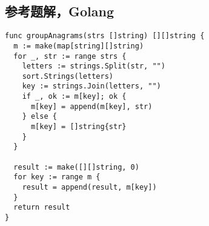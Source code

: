\subsection{参考题解，Golang}

\begin{verbatim}
func groupAnagrams(strs []string) [][]string {
  m := make(map[string][]string)
  for _, str := range strs {
    letters := strings.Split(str, "")
    sort.Strings(letters)
    key := strings.Join(letters, "")
    if _, ok := m[key]; ok {
      m[key] = append(m[key], str)
    } else {
      m[key] = []string{str}
    }
  }

  result := make([][]string, 0)
  for key := range m {
    result = append(result, m[key])
  }
  return result
}
\end{verbatim}
